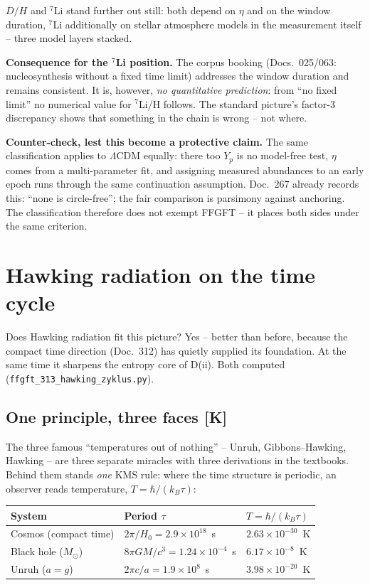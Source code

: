 $D/H$ and ${}^7$Li stand further out still: both depend on $\eta$
and on the window duration, ${}^7$Li additionally on stellar
atmosphere models in the measurement itself -- three model layers
stacked.

\textbf{Consequence for the ${}^7$Li position.} The corpus
booking (Docs.~025/063: nucleosynthesis without a fixed time
limit) addresses the window duration and remains consistent. It
is, however, \emph{no quantitative prediction}: from \enquote{no
fixed limit} no numerical value for ${}^7$Li/H follows. The
standard picture's factor-3 discrepancy shows that something in
the chain is wrong -- not where.

\textbf{Counter-check, lest this become a protective claim.} The
same classification applies to $\Lambda$CDM equally: there too
$Y_p$ is no model-free test, $\eta$ comes from a multi-parameter
fit, and assigning measured abundances to an early epoch runs
through the same continuation assumption. Doc.~267 already
records this: \enquote{none is circle-free}; the fair comparison
is parsimony against anchoring. The classification therefore does
not exempt FFGFT -- it places both sides under the same
criterion.

\chapter{Hawking radiation on the time cycle}

Does Hawking radiation fit this picture? Yes -- better than
before, because the compact time direction (Doc.~312) has quietly
supplied its foundation. At the same time it sharpens the entropy
core of D(ii). Both computed
(\texttt{ffgft\_313\_hawking\_zyklus.py}).

\section{One principle, three faces [K]}

The three famous \enquote{temperatures out of nothing} -- Unruh,
Gibbons--Hawking, Hawking -- are three separate miracles with
three derivations in the textbooks. Behind them stands \emph{one}
KMS rule: where the time structure is periodic, an observer reads
temperature, $T = \hbar/(k_B\tau)$:

\begin{center}
\begin{tabular}{lll}
\toprule
System & Period $\tau$ & $T = \hbar/(k_B\tau)$ \\
\midrule
Cosmos (compact time) & $2\pi/H_0 = 2.9\times10^{18}$~s &
  $2.63\times10^{-30}$~K \\
Black hole ($M_\odot$) & $8\pi GM/c^3 = 1.24\times10^{-4}$~s &
  $6.17\times10^{-8}$~K \\
Unruh ($a = g$) & $2\pi c/a = 1.9\times10^{8}$~s &
  $3.98\times10^{-20}$~K \\
\bottomrule
\end{tabular}
\end{center}

